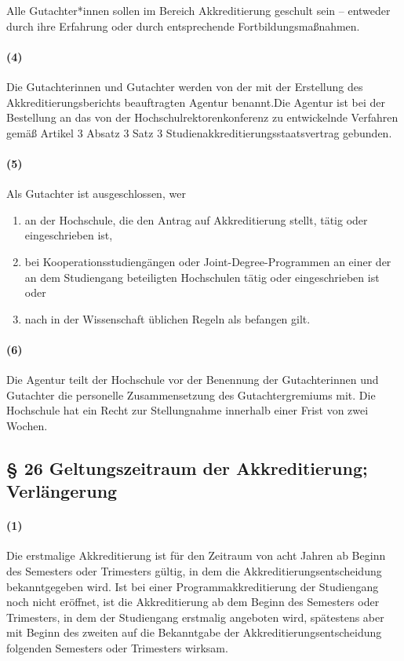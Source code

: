 \documentclass[a4paper]{scrartcl}
\begin{document}
\textcolor{Bernd}{\textbf{\cite{RESO: SoSe2018-RV}} Alle Gutachter*innen sollen im Bereich Akkreditierung geschult sein -- entweder durch ihre Erfahrung oder durch entsprechende Fortbildungsmaßnahmen.}

\paragraph{(4)} Die Gutachterinnen und Gutachter werden von der mit der Erstellung des Akkreditierungsberichts beauftragten Agentur benannt.Die Agentur ist bei der Bestellung an das von der Hochschulrektorenkonferenz zu entwickelnde Verfahren gemäß Artikel 3  Absatz 3 Satz 3 Studienakkreditierungsstaatsvertrag gebunden.
\paragraph{(5)} Als Gutachter ist ausgeschlossen, wer
\begin{enumerate}
\item an der Hochschule, die den Antrag auf Akkreditierung stellt, tätig oder eingeschrieben ist,
\item bei Kooperationsstudiengängen oder Joint-Degree-Programmen an einer der an dem Studiengang beteiligten Hochschulen tätig oder eingeschrieben ist oder
\item nach in der Wissenschaft üblichen Regeln als befangen gilt.
\end{enumerate}
\paragraph{(6)} Die Agentur teilt der Hochschule vor der Benennung der Gutachterinnen und Gutachter die personelle Zusammensetzung des Gutachtergremiums mit. Die Hochschule hat ein Recht zur Stellungnahme innerhalb einer Frist von zwei Wochen.
\subsection{§ 26 Geltungszeitraum der Akkreditierung; Verlängerung}
\paragraph{(1)} Die erstmalige Akkreditierung ist für den Zeitraum von acht Jahren ab Beginn des Semesters oder Trimesters gültig, in dem die Akkreditierungsentscheidung bekanntgegeben wird. Ist bei einer Programmakkreditierung der Studiengang noch nicht eröffnet, ist die Akkreditierung ab dem Beginn des Semesters oder Trimesters, in dem der Studiengang erstmalig angeboten wird, spätestens aber mit Beginn des zweiten auf die Bekanntgabe der Akkreditierungsentscheidung folgenden Semesters oder Trimesters wirksam.\\
\end{document}
